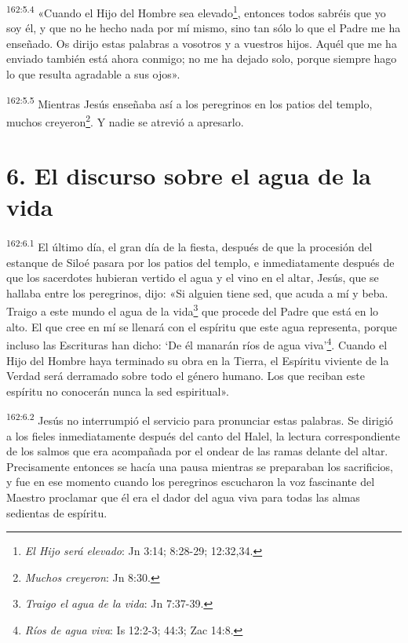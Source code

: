 \par 
\textsuperscript{162:5.4} «Cuando el Hijo del Hombre sea elevado\footnote{\textit{El Hijo será elevado}: Jn 3:14; 8:28-29; 12:32,34.}, entonces todos sabréis que yo soy él, y que no he hecho nada por mí mismo, sino tan sólo lo que el Padre me ha enseñado. Os dirijo estas palabras a vosotros y a vuestros hijos. Aquél que me ha enviado también está ahora conmigo; no me ha dejado solo, porque siempre hago lo que resulta agradable a sus ojos».

\par 
\textsuperscript{162:5.5} Mientras Jesús enseñaba así a los peregrinos en los patios del templo, muchos creyeron\footnote{\textit{Muchos creyeron}: Jn 8:30.}. Y nadie se atrevió a apresarlo.

\section*{6. El discurso sobre el agua de la vida}
\par 
\textsuperscript{162:6.1} El último día, el gran día de la fiesta, después de que la procesión del estanque de Siloé pasara por los patios del templo, e inmediatamente después de que los sacerdotes hubieran vertido el agua y el vino en el altar, Jesús, que se hallaba entre los peregrinos, dijo: «Si alguien tiene sed, que acuda a mí y beba. Traigo a este mundo el agua de la vida\footnote{\textit{Traigo el agua de la vida}: Jn 7:37-39.} que procede del Padre que está en lo alto. El que cree en mí se llenará con el espíritu que este agua representa, porque incluso las Escrituras han dicho: `De él manarán ríos de agua viva'\footnote{\textit{Ríos de agua viva}: Is 12:2-3; 44:3; Zac 14:8.}. Cuando el Hijo del Hombre haya terminado su obra en la Tierra, el Espíritu viviente de la Verdad será derramado sobre todo el género humano. Los que reciban este espíritu no conocerán nunca la sed espiritual».

\par 
\textsuperscript{162:6.2} Jesús no interrumpió el servicio para pronunciar estas palabras. Se dirigió a los fieles inmediatamente después del canto del Halel, la lectura correspondiente de los salmos que era acompañada por el ondear de las ramas delante del altar. Precisamente entonces se hacía una pausa mientras se preparaban los sacrificios, y fue en ese momento cuando los peregrinos escucharon la voz fascinante del Maestro proclamar que él era el dador del agua viva para todas las almas sedientas de espíritu.

